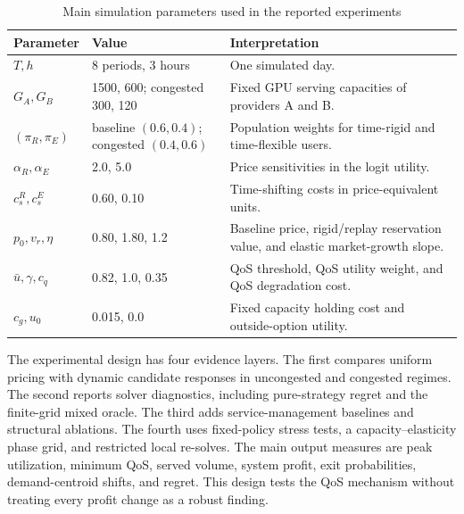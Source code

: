 \documentclass[11pt,a4paper]{article}
\begin{document}
\begin{table}[H]
\centering
\caption{Main simulation parameters used in the reported experiments}
\label{tab:main_parameters}
\small
\begin{tabular}{p{}p{}p{}}
\toprule
Parameter & Value & Interpretation \\
\midrule
$T,h$ & 8 periods, 3 hours & One simulated day. \\
$G_A,G_B$ & 1500, 600; congested 300, 120 & Fixed GPU serving capacities of providers A and B. \\
$(\pi_R,\pi_E)$ & baseline $(0.6,0.4)$; congested $(0.4,0.6)$ & Population weights for time-rigid and time-flexible users. \\
$\alpha_R,\alpha_E$ & 2.0, 5.0 & Price sensitivities in the logit utility. \\
$c_s^R,c_s^E$ & 0.60, 0.10 & Time-shifting costs in price-equivalent units. \\
$p_0,v_r,\eta$ & 0.80, 1.80, 1.2 & Baseline price, rigid/replay reservation value, and elastic market-growth slope. \\
$\bar u,\gamma,c_q$ & 0.82, 1.0, 0.35 & QoS threshold, QoS utility weight, and QoS degradation cost. \\
$c_g,u_0$ & 0.015, 0.0 & Fixed capacity holding cost and outside-option utility. \\
\bottomrule
\end{tabular}
\end{table}

The experimental design has four evidence layers. The first compares uniform pricing with dynamic candidate responses in uncongested and congested regimes. The second reports solver diagnostics, including pure-strategy regret and the finite-grid mixed oracle. The third adds service-management baselines and structural ablations. The fourth uses fixed-policy stress tests, a capacity--elasticity phase grid, and restricted local re-solves. The main output measures are peak utilization, minimum QoS, served volume, system profit, exit probabilities, demand-centroid shifts, and regret. This design tests the QoS mechanism without treating every profit change as a robust finding.
\end{document}
